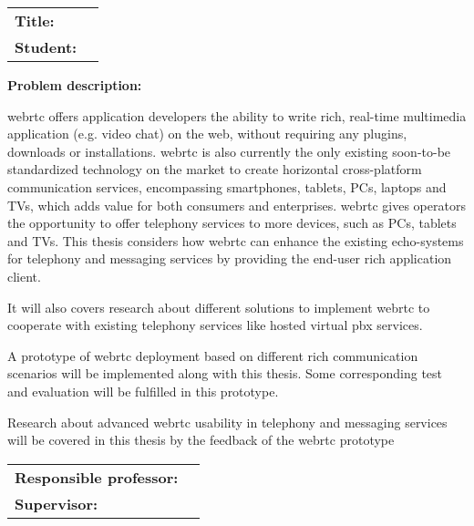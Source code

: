 \begin{titlingpage}

\noindent
\begin{tabular}{@{}p{4cm}l}
\textbf{Title:} 	& \thetitle \\
\textbf{Student:}	& \theauthor \\
\end{tabular}

\vspace{4ex}
\noindent\textbf{Problem description:}
\vspace{2ex}

\noindent \gls{webrtc} offers application developers the ability to write rich, real-time multimedia application (e.g. video chat) on the web, without requiring any plugins, downloads or installations. \gls{webrtc} is also currently the only existing soon-to-be standardized technology on the market to create horizontal cross-platform communication services, encompassing smartphones, tablets, PCs, laptops and TVs, which adds value for both consumers and enterprises. \gls{webrtc} gives operators the opportunity to offer telephony services to more devices, such as PCs, tablets and TVs.
This thesis considers how \gls{webrtc} can enhance the existing echo-systems for telephony and messaging services by providing the end-user rich application client.
\par It will also covers research about different solutions to implement \gls{webrtc} to cooperate with existing telephony services like hosted virtual \gls{pbx} services.
\par A prototype of \gls{webrtc} deployment based on different rich communication scenarios will be implemented along with this thesis. Some corresponding test and evaluation will be fulfilled in this prototype.
\par Research about advanced \gls{webrtc} usability in telephony and messaging services will be covered in this thesis by the feedback of the \gls{webrtc} prototype

\vspace{6ex}

\noindent
\begin{tabular}{@{}p{4cm}l}
\textbf{Responsible professor:} 	& \theprofessor \\
\textbf{Supervisor:}			& \thesupervisor \\
\end{tabular}

\end{titlingpage}